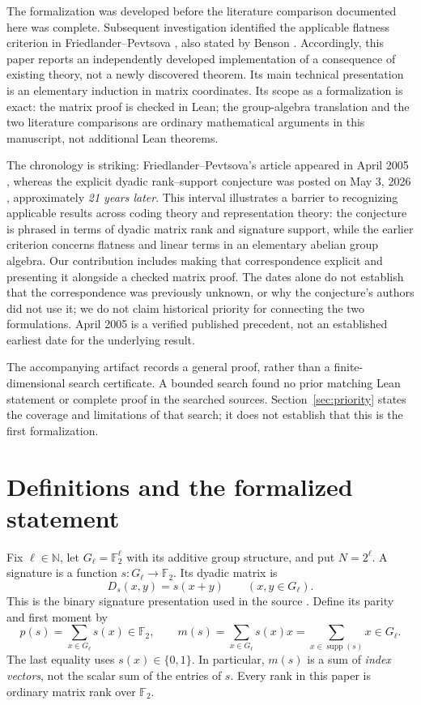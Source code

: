 \documentclass[11pt]{article}
\theoremstyle{definition}
\newcommand{\F}{\mathbb F_2}
\newcommand{\supp}{\operatorname{supp}}
\begin{document}
The formalization was developed before the literature comparison documented here was complete. Subsequent investigation identified the applicable flatness criterion in Friedlander--Pevtsova \cite[Example~2.6]{fp}, also stated by Benson \cite[Section~1.4, p.~6]{benson}. Accordingly, this paper reports an independently developed implementation of a consequence of existing theory, not a newly discovered theorem. Its main technical presentation is an elementary induction in matrix coordinates. Its scope as a formalization is exact: the matrix proof is checked in Lean; the group-algebra translation and the two literature comparisons are ordinary mathematical arguments in this manuscript, not additional Lean theorems.

The chronology is striking: Friedlander--Pevtsova's article appeared in April 2005 \cite{fp}, whereas the explicit dyadic rank--support conjecture was posted on May 3, 2026 \cite{gf}, approximately \emph{21 years later}. This interval illustrates a barrier to recognizing applicable results across coding theory and representation theory: the conjecture is phrased in terms of dyadic matrix rank and signature support, while the earlier criterion concerns flatness and linear terms in an elementary abelian group algebra. Our contribution includes making that correspondence explicit and presenting it alongside a checked matrix proof. The dates alone do not establish that the correspondence was previously unknown, or why the conjecture's authors did not use it; we do not claim historical priority for connecting the two formulations. April 2005 is a verified published precedent, not an established earliest date for the underlying result.

The accompanying artifact \cite{artifact} records a general proof, rather than a finite-dimensional search certificate. A bounded search found no prior matching Lean statement or complete proof in the searched sources. Section~\ref{sec:priority} states the coverage and limitations of that search; it does not establish that this is the first formalization.

\section{Definitions and the formalized statement}\label{sec:statement}

Fix $\ell\in\mathbb N$, let $G_\ell=\F^\ell$ with its additive group structure, and put $N=2^\ell$. A signature is a function $s:G_\ell\to\F$. Its dyadic matrix is
\begin{equation}\label{eq:dyadic}
 D_s(x,y)=s(x+y)\qquad(x,y\in G_\ell).
\end{equation}
This is the binary signature presentation used in the source \cite[Definition~2.1]{gf}. Define its parity and first moment by
\begin{equation}\label{eq:moments}
 p(s)=\sum_{x\in G_\ell}s(x)\in\F,\qquad
 m(s)=\sum_{x\in G_\ell}s(x)x
      =\sum_{x\in\supp(s)}x\in G_\ell.
\end{equation}
The last equality uses $s(x)\in\{0,1\}$. In particular, $m(s)$ is a sum of \emph{index vectors}, not the scalar sum of the entries of $s$. Every rank in this paper is ordinary matrix rank over $\F$.
\end{document}
